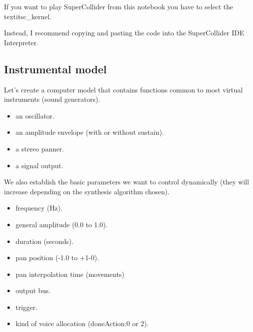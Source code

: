 If you want to play SuperCollider from this notebook you have to select the textit{sc\_kernel}.

Instead, I recommend copying and pasting the code into the SuperCollider IDE Interpreter.

\subsection{Instrumental model}\label{instrumental-model}

Let's create a computer model that contains functions common to most virtual instruments (sound generators).

\begin{itemize}
\tightlist
\item an oscillator.
\item an amplitude envelope (with or without sustain).
\item a stereo panner.
\item a signal output.
\end{itemize}

We also establish the basic parameters we want to control dynamically (they will increase depending on the synthesis algorithm chosen).

\begin{itemize}
\tightlist
\item frequency (Hz).
\item general amplitude (0.0 to 1.0).
\item duration (seconds).
\item pan position (-1.0 to +1-0).
\item pan interpolation time (movements)
\item output bus.
\item trigger.
\item kind of voice allocation (doneAction:0 or 2).
\end{itemize}

